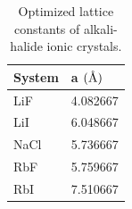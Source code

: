 \documentclass[aps,prb,twocolumn,amsmath,amssymb,superscriptaddress,longbibliography]{revtex4-1}
\newcommand{\angstrom}{\text{\normalfont\AA}}
\begin{document}
\begin{table}[]
\centering
\caption{Optimized lattice constants of alkali-halide ionic crystals.}
\label{table:lattconsts}
\begin{tabular}{|l|l|}
\hline
System & a $(\angstrom)$ \\ \hline
LiF    & 4.082667        \\ \hline
LiI    & 6.048667        \\ \hline
NaCl   & 5.736667        \\ \hline
RbF    & 5.759667        \\ \hline
RbI    & 7.510667        \\ \hline
\end{tabular}
\end{table} 
\end{document}
